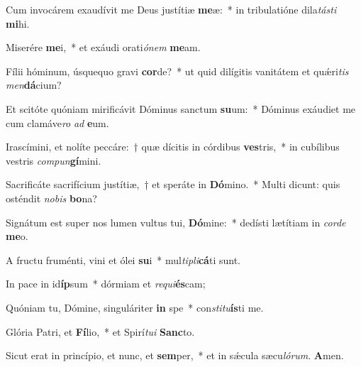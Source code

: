 \item Cum invocárem exaudívit me Deus justítiæ \textbf{me}æ:~* in tribulatióne dila\textit{tás}\textit{ti} \textbf{mi}hi.
\item Miserére \textbf{me}i,~* et exáudi orati\textit{ó}\textit{nem} \textbf{me}am.
\item Fílii hóminum, úsquequo gravi \textbf{cor}de?~* ut quid dilígitis vanitátem et quǽri\textit{tis} \textit{men}\textbf{dá}cium?
\item Et scitóte quóniam mirificávit Dóminus sanctum \textbf{su}um:~* Dóminus exáudiet me cum clamáve\textit{ro} \textit{ad} \textbf{e}um.
\item Irascímini, et nolíte peccáre:~† quæ dícitis in córdibus \textbf{ves}tris,~* in cubílibus vestris \textit{com}\textit{pun}\textbf{gí}mini.
\item Sacrificáte sacrifícium justítiæ,~† et speráte in \textbf{Dó}mino.~* Multi dicunt: quis osténdit \textit{no}\textit{bis} \textbf{bo}na?
\item Signátum est super nos lumen vultus tui, \textbf{Dó}mine:~* dedísti lætítiam in \textit{cor}\textit{de} \textbf{me}o.
\item A fructu fruménti, vini et ólei \textbf{su}i~* mul\textit{ti}\textit{pli}\textbf{cá}ti sunt.
\item In pace in id\textbf{íp}sum~* dórmiam et \textit{re}\textit{qui}\textbf{és}cam;
\item Quóniam tu, Dómine, singuláriter \textbf{in} spe~* con\textit{sti}\textit{tu}\textbf{ís}ti me.
\item Glória Patri, et \textbf{Fí}lio,~* et Spirí\textit{tu}\textit{i} \textbf{Sanc}to.
\item Sicut erat in princípio, et nunc, et \textbf{sem}per,~* et in sǽcula sæcu\textit{ló}\textit{rum}. \textbf{A}men.

